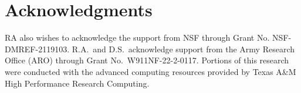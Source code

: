 \section*{Acknowledgments}
 RA also wishes to acknowledge the support from NSF through Grant No. NSF-DMREF-2119103. R.A.~and D.S.~acknowledge support from the Army Research Office (ARO) through Grant No.~W911NF-22-2-0117. Portions of this research were conducted with the advanced computing resources provided by Texas A\&M High Performance Research Computing.
 